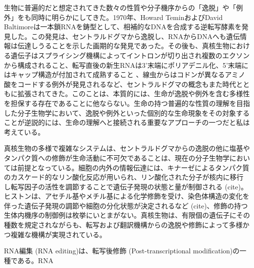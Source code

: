 生物に普遍的だと想定されてきた数々の性質や分子機序からの「逸脱」や「例外」をも同時に明らかにしてきた。1970年、Howard TeminおよびDavid Baltimoreは一本鎖RNAを鋳型として、相補的なDNAを合成する逆転写酵素を発見した\citep{TemMiz7006,Bal7006}。この発見は、セントラルドグマから逸脱し、RNAからDNAへも遺伝情報は伝達しうることを示した画期的な発見であった。その後も、真核生物における遺伝子はスプライシング機構によってイントロンが切り出され複数のエクソンから構成されること\citep{EDMABR6004}、転写直後の新生RNAは3'末端にポリアデニル化\citep{WeiGerMos7504}、5'末端にはキャップ構造が付加されて成熟すること \citep{WeiGerMos7504}、線虫からはコドンが異なるアミノ酸をコードする例外が発見されるなど\citep{HamFujMas1204}、セントラルドグマの概念もまた時代とともに拡張されてきた。このことは、本質的には、生命が逸脱や例外を含む多様性を担保する存在であることに他ならない。生命の持つ普遍的な性質の理解を目指した分子生物学において、逸脱や例外といった個別的な生命現象をその対象することが逆説的には、生命の理解へと接続される重要なアプローチの一つだと私は考えている。
\par
真核生物の多様で複雑なシステムは、セントラルドグマからの逸脱の他に塩基やタンパク質への修飾が生命活動に不可欠であることは、現在の分子生物学においては前提となっている。細胞の内外の情報伝達には、キナーゼによるタンパク質のカスケード的なリン酸化反応が用いられ、リン酸化された分子が核内に移行し転写因子の活性を調節することで遺伝子発現の状態と量が制御される (cite)。ヒストンは、アセチル基やメチル基による化学修飾を受け、染色体構造の変化を伴った遺伝子発現の調節や細胞の分化状態が決定されるなど (cite)、修飾の持つ生体内機序の制御例は枚挙にいとまがない。真核生物は、有限個の遺伝子にその種数を規定されながらも、転写および翻訳機構からの逸脱や修飾によって多様かつ複雑な機構が実現されている。
\par
RNA編集 (RNA editing)は、転写後修飾 (Post-transcriptional modification)の一種である。RNA 
